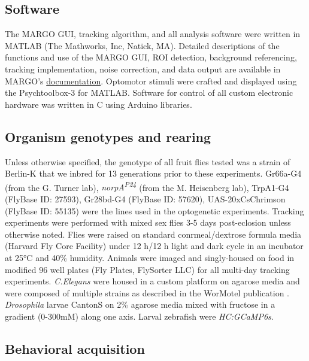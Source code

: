 \documentclass[12pt,letterpaper]{article}
\begin{document}
 \subsection*{Software}
 
The MARGO GUI, tracking algorithm, and all analysis software were written in MATLAB (The Mathworks, Inc, Natick, MA). Detailed descriptions of the functions and use of the MARGO GUI, ROI detection, background referencing, tracking implementation, noise correction, and data output are available in MARGO's \href{https://github.com/de-Bivort-Lab/margo/wiki}{documentation}. Optomotor stimuli were crafted and displayed using the Psychtoolbox-3 for MATLAB. Software for control of all custom electronic hardware was written in C using Arduino libraries.

 \subsection*{Organism genotypes and rearing}
 
Unless otherwise specified, the genotype of all fruit flies tested was a strain of Berlin-K that we inbred for 13 generations prior to these experiments. Gr66a-G4 (from the G. Turner lab), \textit{norpA\textsuperscript{P24}} (from the M. Heisenberg lab), TrpA1-G4 (FlyBase ID: 27593), Gr28bd-G4 (FlyBase ID: 57620), UAS-20xCsChrimson (FlyBase ID: 55135) were the lines used in the optogenetic experiments. Tracking experiments were performed with mixed sex flies 3-5 days post-eclosion unless otherwise noted. Flies were raised on standard conrmeal/dextrose formula media (Harvard Fly Core Facility) under 12 h/12 h light and dark cycle in an incubator at 25°C and 40\% humidity. Animals were imaged and singly-housed on food in modified 96 well plates (Fly Plates, FlySorter LLC) for all multi-day tracking experiments. \textit{C.Elegans} were housed in a custom platform on agarose media and were composed of multiple strains as described in the WorMotel publication \cite{Churgin_Longitudinal_2017}. \textit{Drosophila} larvae CantonS on 2\% agarose media mixed with fructose in a gradient (0-300mM) along one axis. Larval zebrafish were \textit{HC:GCaMP6s}.

 \subsection*{Behavioral acquisition}
\end{document}
